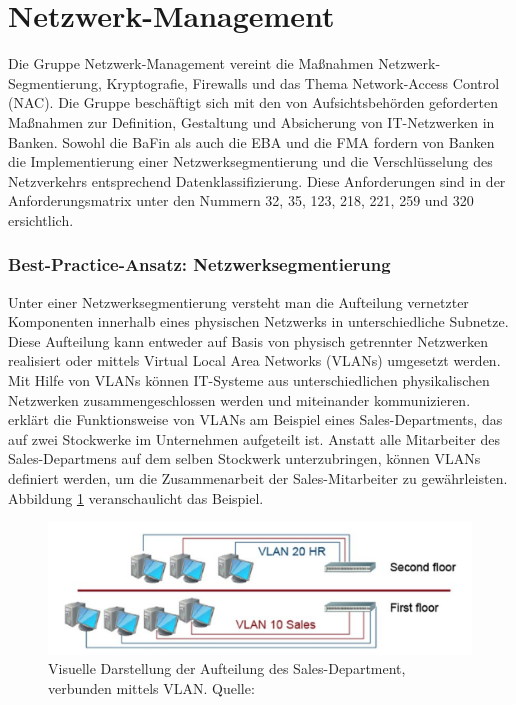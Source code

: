\section{Netzwerk-Management}
Die Gruppe \glqq{}Netzwerk-Management\grqq{} vereint die Maßnahmen \glqq{}Netzwerk-Segmentierung\grqq{}, \glqq{}Kryptografie\grqq{}, \glqq{}Firewalls\grqq{} und das Thema \glqq{}Network-Access Control\grqq{} (NAC). Die Gruppe beschäftigt sich mit den von Aufsichtsbehörden geforderten Maßnahmen zur Definition, Gestaltung und Absicherung von IT-Netzwerken in Banken.
\bigbreak
Sowohl die BaFin als auch die EBA und die FMA fordern von Banken die Implementierung einer Netzwerksegmentierung und die Verschlüsselung des Netzverkehrs entsprechend Datenklassifizierung. Diese Anforderungen sind in der Anforderungsmatrix unter den Nummern 32, 35, 123, 218, 221, 259 und 320 ersichtlich.
\subsubsection{Best-Practice-Ansatz: Netzwerksegmentierung}
Unter einer Netzwerksegmentierung versteht man die Aufteilung vernetzter Komponenten innerhalb eines physischen Netzwerks in unterschiedliche Subnetze. Diese Aufteilung kann entweder auf Basis von physisch getrennter Netzwerken realisiert oder mittels \glqq{}Virtual Local Area Networks\grqq{} (VLANs) umgesetzt werden. Mit Hilfe von VLANs können IT-Systeme aus unterschiedlichen physikalischen Netzwerken zusammengeschlossen werden und miteinander kommunizieren. \textcite{SheikhAhmedF2020CSCS} erklärt die Funktionsweise von VLANs am Beispiel eines Sales-Departments, das auf zwei Stockwerke im Unternehmen aufgeteilt ist. Anstatt alle Mitarbeiter des Sales-Departmens auf dem selben Stockwerk unterzubringen, können VLANs definiert werden, um die Zusammenarbeit der Sales-Mitarbeiter zu gewährleisten. Abbildung \ref{fig:VLAN} veranschaulicht das Beispiel.

\begin{figure}[H]
  \centering
  \includegraphics[width=\linewidth]{images/uploads/a_figure_08.png}
  \caption{Visuelle Darstellung der Aufteilung des Sales-Department, verbunden mittels VLAN. Quelle: \textcite{SheikhAhmedF2020CSCS}}
  \label{fig:VLAN}
\end{figure}
\bigbreak

